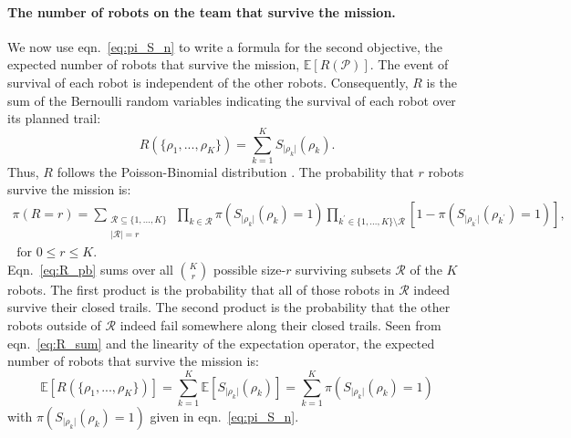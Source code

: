 \documentclass[11pt, oneside]{article}
\begin{document}
\paragraph{The number of robots on the team that survive the mission.}
We now use eqn.~\ref{eq:pi_S_n} to write a formula for the second objective, the expected number of robots that survive the mission, $\mathbb{E}[R(\mathcal{P})]$.
The event of survival of each robot is independent of the other robots.
Consequently, $R$ is the sum of the Bernoulli random variables indicating the survival of each robot over its planned trail:
\begin{equation}
	R(\{\rho_1, ..., \rho_K\})=\sum_{k=1}^K S_{\lvert \rho_k \rvert}(\rho_k). \label{eq:R_sum}
\end{equation}
Thus, $R$ follows the Poisson-Binomial distribution \cite{tang2023poisson}.
The probability that $r$ robots survive the mission is:
\begin{multline}
	\pi(R=r) = \sum_{\substack{\mathcal{R} \subseteq \{1, ..., K\}  \\ \lvert \mathcal{R} \rvert = r} } \,
	\prod_{k \in \mathcal{R}} \pi(S_{\lvert \rho_k \rvert}(\rho_k) = 1)
	\prod_{k^\prime \in \{1, ..., K\} \setminus \mathcal{R}} [1- \pi(S_{\lvert \rho_{k^\prime} \rvert}(\rho_{k^\prime}) = 1)], \\ \text{ for } 0 \leq r \leq K.
	\label{eq:R_pb}
\end{multline}
Eqn.~\ref{eq:R_pb} sums over all $\binom{K}{r}$ possible size-$r$ surviving subsets $\mathcal{R}$ of the $K$ robots. The first product is the probability that all of those robots in $\mathcal{R}$ indeed survive their closed trails. The second product is the probability that the other robots outside of $\mathcal{R}$ indeed fail somewhere along their closed trails.
Seen from eqn.~\ref{eq:R_sum} and the linearity of the expectation operator, the expected number of robots that survive the mission is:
\begin{equation}
	\mathbb{E}[R(\{\rho_1, ..., \rho_K\})]=\sum_{k=1}^K \mathbb{E}[S_{\lvert \rho_k \rvert}(\rho_k)] = \sum_{k=1}^K  \pi(S_{\lvert \rho_k \rvert}(\rho_k) = 1) \label{eq:formula_obj2}
\end{equation} with $\pi(S_{\lvert \rho_k \rvert}(\rho_k) = 1)$ given in eqn.~\ref{eq:pi_S_n}.
\end{document}
